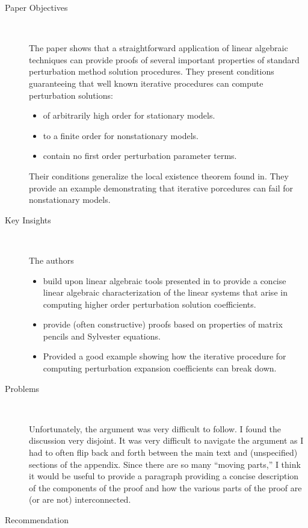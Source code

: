 \documentclass[12pt]{article}
\begin{document}
\begin{description}
\item[Paper Objectives]\ 

 The paper shows that a straightforward application of
linear algebraic techniques can provide proofs of several important properties
of standard perturbation method solution procedures.
They present 
conditions guaranteeing that well known iterative procedures can compute perturbation solutions:
  \begin{itemize}
  \item of arbitrarily high order for stationary models.
  \item to a finite order for nonstationary models.
  \item contain no first order perturbation parameter terms.
\end{itemize}
Their conditions generalize the local existence theorem found in\cite{jin02}.
They provide an example demonstrating that iterative porcedures can fail for
nonstationary models.

\item[Key Insights] \ 

The authors 

\begin{itemize}
\item build upon linear algebraic tools presented in\cite{vetter1973} to provide
a concise linear algebraic characterization of the linear systems that
arise in computing higher order perturbation solution coefficients.
\item provide (often constructive) proofs based on properties of 
matrix pencils and Sylvester equations.
\item Provided a good example showing how the iterative procedure for computing
perturbation expansion coefficients can break down.
\end{itemize}

\item[Problems] \ 

Unfortunately, the argument was very difficult to follow. I found the discussion
very disjoint.  It was very difficult to navigate the argument as I had to
often flip back and forth between the main text and (unspecified) sections
of the appendix. 
Since there are so many ``moving parts,'' I think
 it would be useful to provide a paragraph
providing a  concise description of the components of the proof and  how the
various  parts of the proof are (or are not) interconnected.

\item[Recommendation] \ 


\end{description}
\end{document}
